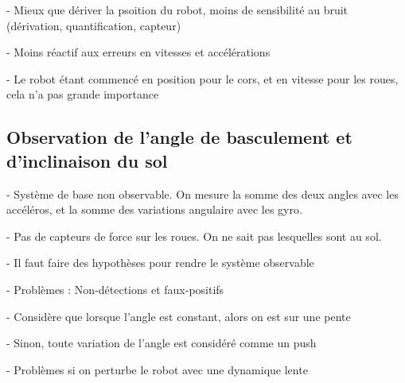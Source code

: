 			- Mieux que dériver la psoition du robot, moins de sensibilité au bruit (dérivation, quantification, capteur)

			- Moins réactif aux erreurs en vitesses et accélérations

			- Le robot étant commencé en position pour le cors, et en vitesse pour les roues, cela n'a pas grande importance

		\subsection{Observation de l'angle de basculement et d'inclinaison du sol}
		\label{section.mesure_tilt_pente}
			
			- Système de base non observable. On mesure la somme des deux angles avec les accéléros, et la somme des variations angulaire avec les gyro.

			- Pas de capteurs de force sur les roues. On ne sait pas lesquelles sont au sol.

			- Il faut faire des hypothèses pour rendre le système observable

			- Problèmes : Non-détections et faux-positifs

			- Considère que lorsque l'angle est constant, alors on est sur une pente

			- Sinon, toute variation de l'angle est considéré comme un push

			- Problèmes si on perturbe le robot avec une dynamique lente

			